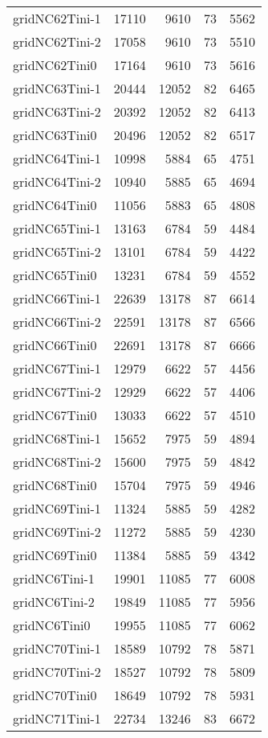 \begin{longtable}{lrrrr}
gridNC62Tini-1 & 17110 & 9610 & 73 & 5562 \\
gridNC62Tini-2 & 17058 & 9610 & 73 & 5510 \\
gridNC62Tini0 & 17164 & 9610 & 73 & 5616 \\
gridNC63Tini-1 & 20444 & 12052 & 82 & 6465 \\
gridNC63Tini-2 & 20392 & 12052 & 82 & 6413 \\
gridNC63Tini0 & 20496 & 12052 & 82 & 6517 \\
gridNC64Tini-1 & 10998 & 5884 & 65 & 4751 \\
gridNC64Tini-2 & 10940 & 5885 & 65 & 4694 \\
gridNC64Tini0 & 11056 & 5883 & 65 & 4808 \\
gridNC65Tini-1 & 13163 & 6784 & 59 & 4484 \\
gridNC65Tini-2 & 13101 & 6784 & 59 & 4422 \\
gridNC65Tini0 & 13231 & 6784 & 59 & 4552 \\
gridNC66Tini-1 & 22639 & 13178 & 87 & 6614 \\
gridNC66Tini-2 & 22591 & 13178 & 87 & 6566 \\
gridNC66Tini0 & 22691 & 13178 & 87 & 6666 \\
gridNC67Tini-1 & 12979 & 6622 & 57 & 4456 \\
gridNC67Tini-2 & 12929 & 6622 & 57 & 4406 \\
gridNC67Tini0 & 13033 & 6622 & 57 & 4510 \\
gridNC68Tini-1 & 15652 & 7975 & 59 & 4894 \\
gridNC68Tini-2 & 15600 & 7975 & 59 & 4842 \\
gridNC68Tini0 & 15704 & 7975 & 59 & 4946 \\
gridNC69Tini-1 & 11324 & 5885 & 59 & 4282 \\
gridNC69Tini-2 & 11272 & 5885 & 59 & 4230 \\
gridNC69Tini0 & 11384 & 5885 & 59 & 4342 \\
gridNC6Tini-1 & 19901 & 11085 & 77 & 6008 \\
gridNC6Tini-2 & 19849 & 11085 & 77 & 5956 \\
gridNC6Tini0 & 19955 & 11085 & 77 & 6062 \\
gridNC70Tini-1 & 18589 & 10792 & 78 & 5871 \\
gridNC70Tini-2 & 18527 & 10792 & 78 & 5809 \\
gridNC70Tini0 & 18649 & 10792 & 78 & 5931 \\
gridNC71Tini-1 & 22734 & 13246 & 83 & 6672 \\

\end{longtable}
